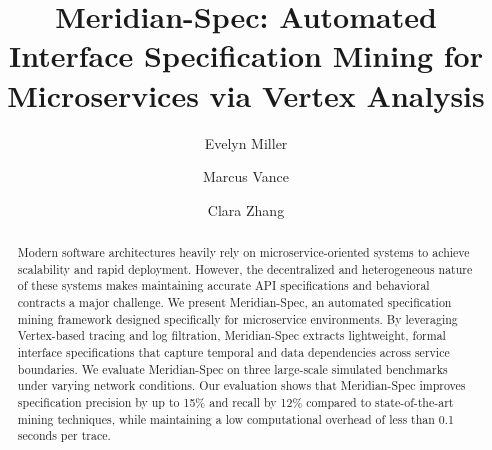 \documentclass[acmsmall,screen,review,anonymous]{acmart}
\begin{document}
\title{Meridian-Spec: Automated Interface Specification Mining for Microservices via Vertex
Analysis}

\author{Evelyn Miller}

\author{Marcus Vance}

\author{Clara Zhang}

\renewcommand{\shortauthors}{Miller et al.}

\begin{abstract}
Modern software architectures heavily rely on microservice-oriented systems to achieve
scalability and rapid deployment. However, the decentralized and heterogeneous nature of
these systems makes maintaining accurate API specifications and behavioral contracts a major
challenge. We present Meridian-Spec, an automated specification mining framework designed
specifically for microservice environments. By leveraging Vertex-based tracing and log
filtration, Meridian-Spec extracts lightweight, formal interface specifications that capture
temporal and data dependencies across service boundaries. We evaluate Meridian-Spec on three
large-scale simulated benchmarks under varying network conditions. Our evaluation shows that
Meridian-Spec improves specification precision by up to 15\% and recall by 12\% compared to
state-of-the-art mining techniques, while maintaining a low computational overhead of less
than 0.1 seconds per trace.
\end{abstract}



\maketitle

\noindent{}











\end{document}
